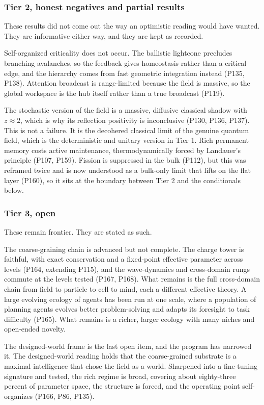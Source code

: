 \subsubsection{Tier 2, honest negatives and partial results}

These results did not come out the way an optimistic reading would have wanted. They are informative either
way, and they are kept as recorded.

Self-organized criticality does not occur. The ballistic lightcone precludes branching avalanches, so the
feedback gives homeostasis rather than a critical edge, and the hierarchy comes from fast geometric
integration instead (P135, P138). Attention broadcast is range-limited because the field is massive, so the
global workspace is the hub itself rather than a true broadcast (P119).

The stochastic version of the field is
a massive, diffusive classical shadow with $z \approx 2$, which is why its reflection positivity is
inconclusive (P130, P136, P137). This is not a failure. It is the decohered classical limit of the genuine
quantum field, which is the deterministic and unitary version in Tier 1. Rich permanent memory costs active
maintenance, thermodynamically forced by Landauer's principle (P107, P159). Fission is suppressed in the bulk
(P112), but this was reframed twice and is now understood as a bulk-only limit that lifts on the flat layer
(P160), so it sits at the boundary between Tier 2 and the conditionals below.

\subsubsection{Tier 3, open}

These remain frontier. They are stated as such.

The coarse-graining chain is advanced but not complete. The charge tower is faithful, with exact conservation
and a fixed-point effective parameter across levels (P164, extending P115), and the wave-dynamics and
cross-domain rungs commute at the levels tested (P167, P168). What remains is the full cross-domain chain from
field to particle to cell to mind, each a different effective theory. A large evolving ecology of agents has
been run at one scale, where a population of planning agents evolves better problem-solving and adapts its
foresight to task difficulty (P165). What remains is a richer, larger ecology with many niches and open-ended
novelty.

The designed-world frame is the last open item, and the program has narrowed it. The designed-world reading
holds that the coarse-grained substrate is a maximal intelligence that chose the field as a world. Sharpened
into a fine-tuning signature and tested, the rich regime is broad, covering about eighty-three percent of
parameter space, the structure is forced, and the operating point self-organizes (P166, P86, P135).

